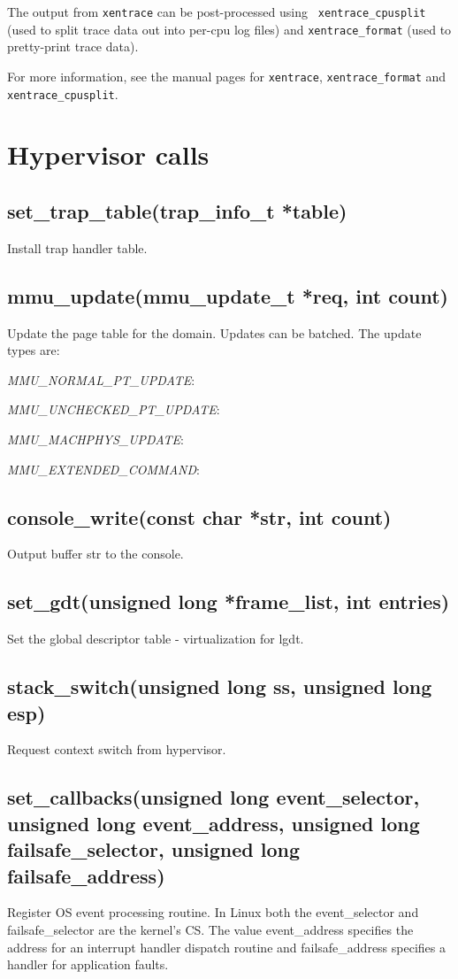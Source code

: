 \documentclass[11pt,twoside,final,openright]{xenstyle}
\begin{document}
The output from {\tt xentrace} can be post-processed using {\tt
xentrace\_cpusplit} (used to split trace data out into per-cpu log files) and
{\tt xentrace\_format} (used to pretty-print trace data).

For more information, see the manual pages for {\tt xentrace},
{\tt xentrace\_format} and {\tt xentrace\_cpusplit}.


\chapter{Hypervisor calls}

\section{ set\_trap\_table(trap\_info\_t *table)} 

Install trap handler table.

\section{ mmu\_update(mmu\_update\_t *req, int count)} 
Update the page table for the domain. Updates can be batched.
The update types are: 

{\it MMU\_NORMAL\_PT\_UPDATE}:

{\it MMU\_UNCHECKED\_PT\_UPDATE}:

{\it MMU\_MACHPHYS\_UPDATE}:

{\it MMU\_EXTENDED\_COMMAND}:

\section{ console\_write(const char *str, int count)}
Output buffer str to the console.

\section{ set\_gdt(unsigned long *frame\_list, int entries)} 
Set the global descriptor table - virtualization for lgdt.

\section{ stack\_switch(unsigned long ss, unsigned long esp)} 
Request context switch from hypervisor.

\section{ set\_callbacks(unsigned long event\_selector, unsigned long event\_address,
                        unsigned long failsafe\_selector, unsigned long failsafe\_address) } 
 Register OS event processing routine. In Linux both the event\_selector and 
failsafe\_selector are the kernel's CS. The value event\_address specifies the address for
an interrupt handler dispatch routine and failsafe\_address specifies a handler for 
application faults.
\end{document}
